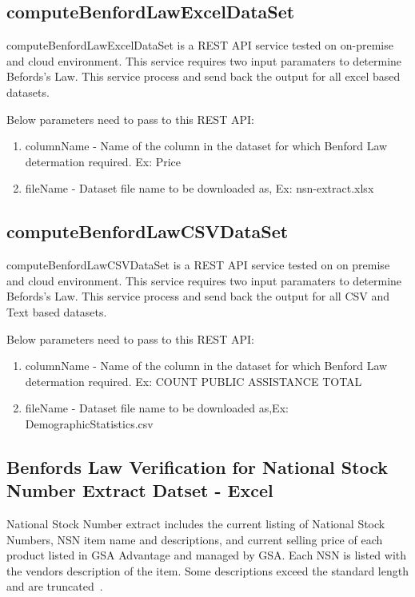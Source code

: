 \subsection{computeBenfordLawExcelDataSet}
computeBenfordLawExcelDataSet is a REST API service tested on 
on-premise and cloud environment. This service requires two 
input paramaters to determine Befords's Law. This service
process and send back the output 
for all excel based datasets.

Below parameters need to pass to this REST API:

\begin{enumerate}
\item columnName - Name of the column in the 
 dataset for which Benford Law determation required. 
 Ex: Price
\item fileName - Dataset file name to be downloaded 
 as, Ex: nsn-extract.xlsx
\end{enumerate}

\subsection{computeBenfordLawCSVDataSet}
computeBenfordLawCSVDataSet is a REST API service 
tested on on premise and cloud environment. 
This service requires two input paramaters to 
determine Befords's Law. This service
process and send back the output 
for all CSV and Text based datasets.

Below parameters need to pass to this REST API:

\begin{enumerate}
\item columnName - Name of the column in the 
 dataset for which Benford Law determation required. 
 Ex: COUNT PUBLIC ASSISTANCE TOTAL
\item fileName - Dataset file name to be downloaded 
 as,Ex: DemographicStatistics.csv
\end{enumerate}

\subsection{Benfords Law Verification for National Stock 
Number Extract Datset - Excel}
National Stock Number extract includes the current 
listing of National Stock Numbers, 
NSN item name and descriptions, and current 
selling price of each product listed in GSA 
Advantage and managed by GSA. Each NSN is 
listed with the vendors description of the item. 
Some descriptions exceed the standard length and are 
truncated~\cite{hid-sp18-514-nsn-ds-desc}.


